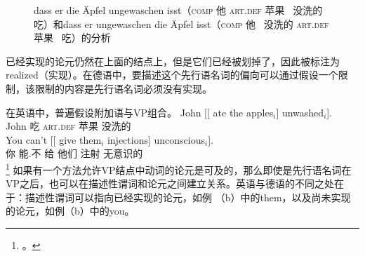 \begin{figure}
\caption{dass er die Äpfel ungewaschen isst（\textsc{comp} 他 \textsc{art}.\textsc{def} 苹果 \, 没洗的 \, 吃）和dass er ungewaschen die Äpfel isst（\textsc{comp} 他 \, 没洗的 \textsc{art}.\textsc{def} 苹果 \, 吃）的分析}\label{anal-er-die-frau-nackt-sieht}
\end{figure}%
已经实现的论元仍然在上面的结点上，但是它们已经被划掉了，因此被标注为realized（实现）。在德语中，要描述这个先行语名词的偏向可以通过假设一个限制，该限制的内容是先行语名词必须没有实现。

在英语中，普遍假设附加语与VP组合。
\eal
\ex 
\gll John [[ ate the apples$_i$] unwashed$_i$].\\
	John {} 吃 \textsc{art}.\textsc{def} 苹果 没洗的\\
\ex 
\gll You can't [[ give them$_i$ injections] unconscious$_i$].\\
	你 能.不 {} 给 他们 注射 无意识的\\
\footnote{%
 。
}
\zl
如果有一个方法允许VP结点中动词的论元是可及的，那么即使是先行语名词在VP之后，也可以在描述性谓词和论元之间建立关系。英语与德语的不同之处在于：描述性谓词可以指向已经实现的论元，如例 （b）中的them，以及尚未实现的论元，如例（b）中的you。


